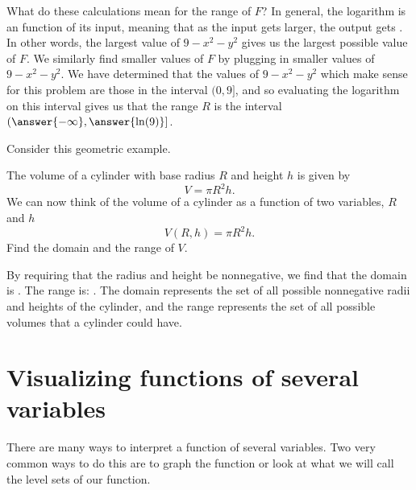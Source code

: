 \documentclass{ximera}
\begin{document}
\begin{question}
\begin{question}
\begin{question}
\begin{prompt}
        What do these calculations mean for the range of $F$?  In general, the 
        logarithm is an  
        function of its input, meaning that as the input gets larger, the output  
        gets .  In other words, 
        the largest value of $9-x^2-y^2$ gives us the largest possible value of $F$. 
        We similarly find smaller values of $F$ by plugging in smaller values of 
        $9-x^2-y^2$.  We have determined that the values of $9-x^2-y^2$ which 
        make sense for this problem are those in the interval $(0, 9]$, and so 
        evaluating the logarithm on this interval gives us that the 
        range $R$ is the interval $(\answer{-\infty},\answer{\ln(9)}]$.
      \end{prompt}
    \end{question}
  \end{question}
\end{question}

Consider this geometric example.
\begin{example}
  The volume of a cylinder with base radius $R$ and height $h$ is
  given by
  \[
  V=\pi R^2h.
  \]
  We can now think of the volume of a cylinder as a function of two
  variables, $R$ and $h$
  \[
  V(R,h) = \pi R^2h.
  \]
  Find the domain and the range of $V$.
  \begin{explanation}
    By requiring that the radius and height be nonnegative, we find that the domain is
    \wordChoice{
      \choice{$\R$}
      \choice{$[0,\infty)$}
      \choice[correct]{Points $(R,h)$ in $\R^2$ where $R \geq 0$ and $h \geq 0$, or in set notation $\{ (R,h) \in \R^2 : R \geq 0, h \geq 0\}$}
      }. 
The range is:
\wordChoice{
  \choice{$\R$}
  \choice[correct]{$[0,\infty)$}
  \choice{$\{ (R,h) \in \R^2 : R \geq 0, h \geq 0\}$}
  }.
The domain represents the set of all possible nonnegative radii and heights of the cylinder, and the range represents the set of all possible volumes that a cylinder could have.
  \end{explanation}
\end{example}



\section{Visualizing functions of several variables}

There are many ways to interpret a function of several variables.  Two
very common ways to do this are to graph the function or look at
what we will call the level sets of our function.
\end{document}
